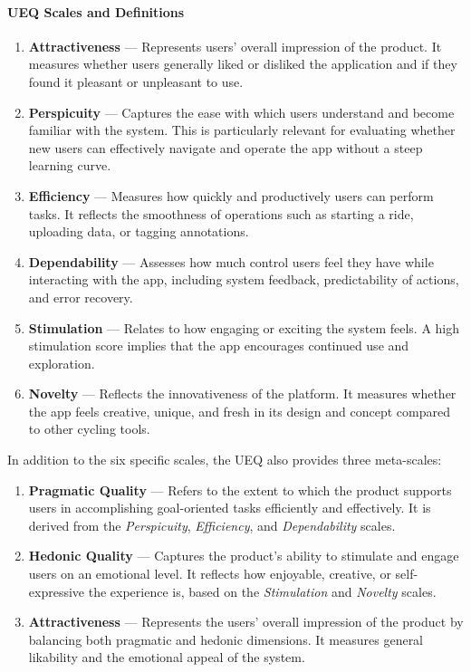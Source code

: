 \paragraph{UEQ Scales and Definitions}
\begin{enumerate}
\item \textbf{Attractiveness} — Represents users' overall impression of the product. It measures whether users generally liked or disliked the application and if they found it pleasant or unpleasant to use.

\item \textbf{Perspicuity} — Captures the ease with which users understand and become familiar with the system. This is particularly relevant for evaluating whether new users can effectively navigate and operate the app without a steep learning curve.

\item \textbf{Efficiency} — Measures how quickly and productively users can perform tasks. It reflects the smoothness of operations such as starting a ride, uploading data, or tagging annotations.

\item \textbf{Dependability} — Assesses how much control users feel they have while interacting with the app, including system feedback, predictability of actions, and error recovery.

\item \textbf{Stimulation} — Relates to how engaging or exciting the system feels. A high stimulation score implies that the app encourages continued use and exploration.

\item \textbf{Novelty} — Reflects the innovativeness of the platform. It measures whether the app feels creative, unique, and fresh in its design and concept compared to other cycling tools.

\end{enumerate}

In addition to the six specific scales, the UEQ also provides three meta-scales:

\begin{enumerate}
\item \textbf{Pragmatic Quality} — Refers to the extent to which the product supports users in accomplishing goal-oriented tasks efficiently and effectively. It is derived from the \textit{Perspicuity}, \textit{Efficiency}, and \textit{Dependability} scales.

\item \textbf{Hedonic Quality} — Captures the product's ability to stimulate and engage users on an emotional level. It reflects how enjoyable, creative, or self-expressive the experience is, based on the \textit{Stimulation} and \textit{Novelty} scales.

\item \textbf{Attractiveness} — Represents the users' overall impression of the product by balancing both pragmatic and hedonic dimensions. It measures general likability and the emotional appeal of the system.
\end{enumerate}

